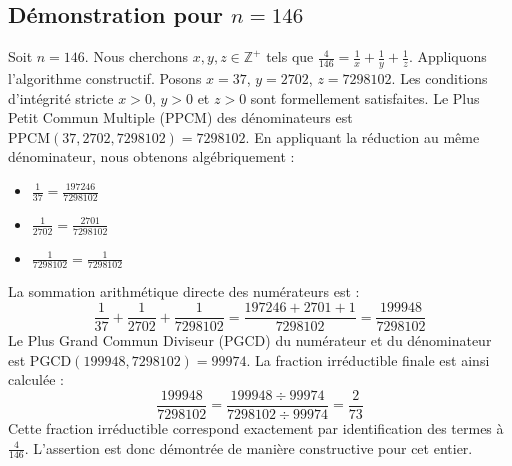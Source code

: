 \documentclass[11pt,a4paper]{article}
\begin{document}
\subsection{Démonstration pour $n = 146$}
Soit $n = 146$. Nous cherchons $x, y, z \in \mathbb{Z}^{+}$ tels que $\frac{4}{146} = \frac{1}{x} + \frac{1}{y} + \frac{1}{z}$.
Appliquons l'algorithme constructif. Posons $x = 37$, $y = 2702$, $z = 7298102$.
Les conditions d'intégrité stricte $x > 0$, $y > 0$ et $z > 0$ sont formellement satisfaites.
Le Plus Petit Commun Multiple (PPCM) des dénominateurs est $\text{PPCM}(37, 2702, 7298102) = 7298102$.
En appliquant la réduction au même dénominateur, nous obtenons algébriquement :
\begin{itemize}
    \item $\frac{1}{37} = \frac{197246}{7298102}$
    \item $\frac{1}{2702} = \frac{2701}{7298102}$
    \item $\frac{1}{7298102} = \frac{1}{7298102}$
\end{itemize}
La sommation arithmétique directe des numérateurs est :
$$ \frac{1}{37} + \frac{1}{2702} + \frac{1}{7298102} = \frac{197246 + 2701 + 1}{7298102} = \frac{199948}{7298102} $$
Le Plus Grand Commun Diviseur (PGCD) du numérateur et du dénominateur est $\text{PGCD}(199948, 7298102) = 99974$.
La fraction irréductible finale est ainsi calculée :
$$ \frac{199948}{7298102} = \frac{199948 \div 99974}{7298102 \div 99974} = \frac{2}{73} $$
Cette fraction irréductible correspond exactement par identification des termes à $\frac{4}{146}$. L'assertion est donc démontrée de manière constructive pour cet entier.
\end{document}

